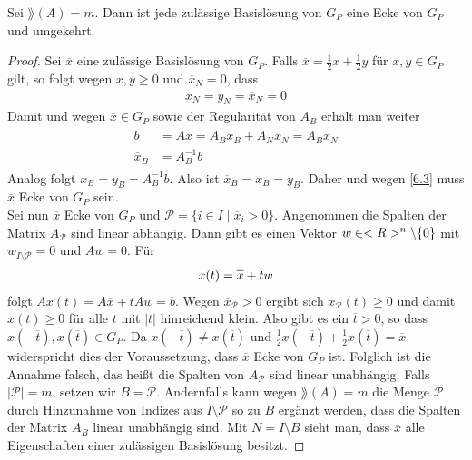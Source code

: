 \begin{proposition}
	Sei $\rang(A)=m$. Dann ist jede zulässige Basislösung von $G_P$ eine Ecke von $G_P$ und umgekehrt.
\end{proposition}
\begin{proof}
	Sei $\overline{x}$ eine zulässige Basislösung von $G_P$. Falls $\overline{x}=\frac{1}{2}x+\frac{1}{2}y$ für $x,y\in G_P$ gilt, so folgt wegen $x,y\ge 0$ und $\overline{x}_N=0$, dass
	\begin{align}
		\label{6.3}
		x_N=y_N=\overline{x}_N=0
	\end{align}
	Damit und wegen $\overline{x}\in G_P$ sowie der Regularität von $A_B$ erhält man weiter
	\begin{align}
		\label{6.4}
		\begin{split}
			b &= A\overline{x} = A_B\overline{x}_B + A_N\overline{x}_N = A_B\overline{x}_N \\
			\overline{x}_B &= A^{-1}_Bb
		\end{split}
	\end{align}
	Analog folgt $x_B=y_B=A^{-1}_Bb$. Also ist $\overline{x}_B=x_B=y_B$. Daher und wegen \cref{6.3} muss $\overline{x}$ Ecke von $G_P$ sein. \\
	Sei nun $\overline{x}$ Ecke von $G_P$ und $\mathcal{P}=\{i\in I\mid \overline{x}_i>0\}$. Angenommen die Spalten der Matrix $A_\mathcal{P}$ sind linear abhängig. Dann gibt es einen Vektor $w\in<R>^n\backslash\{0\}$ mit $w_{I\setminus\mathcal{P}}=0$ und $Aw=0$. Für
	\begin{align}
		x(t) = \overline{x} + tw\notag
	\end{align}
	folgt $Ax(t)=A\overline{x} + tAw=b$. Wegen $\overline{x}_\mathcal{P}>0$ ergibt sich $x_\mathcal{P}(t)\ge 0$ und damit $x(t)\ge 0$ für alle $t$ mit $\vert t\vert$ hinreichend klein. Also gibt es ein $\overline{t}>0$, so dass $x(-\overline{t}),x(\overline{t})\in G_P$. Da $x(-\overline{t})\neq x(\overline{t})$ und $\frac{1}{2}x(-\overline{t}) + \frac{1}{2}x(\overline{t})=\overline{x}$ widerspricht dies der Voraussetzung, dass $\overline{x}$ Ecke von $G_P$ ist. Folglich ist die Annahme falsch, das heißt die Spalten von $A_\mathcal{P}$ sind linear unabhängig. Falls $\vert \mathcal{P}\vert=m$, setzen wir $B=\mathcal{P}$. Andernfalls kann wegen $\rang(A)=m$ die Menge $\mathcal{P}$ durch Hinzunahme von Indizes aus $I\setminus \mathcal{P}$ so zu $B$ ergänzt werden, dass die Spalten der Matrix $A_B$ linear unabhängig sind. Mit $N=I\setminus B$ sieht man, dass $\overline{x}$ alle Eigenschaften einer zulässigen Basislösung besitzt.
\end{proof}